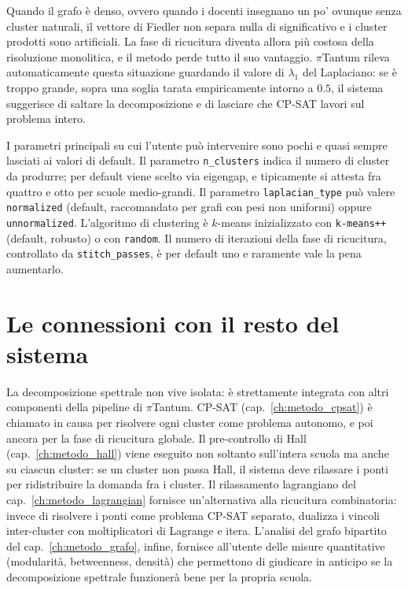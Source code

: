 \begin{avvertenzabox}
Quando il grafo \`e denso, ovvero quando i docenti
insegnano un po' ovunque senza cluster naturali, il vettore
di Fiedler non separa nulla di significativo e i cluster
prodotti sono artificiali. La fase di ricucitura diventa
allora pi\`u costosa della risoluzione monolitica, e il
metodo perde tutto il suo vantaggio. $\pi$Tantum rileva
automaticamente questa situazione guardando il valore di
$\lambda_1$ del Laplaciano: se \`e troppo grande, sopra una
soglia tarata empiricamente intorno a $0.5$, il sistema
suggerisce di saltare la decomposizione e di lasciare che
CP-SAT lavori sul problema intero.
\end{avvertenzabox}

I parametri principali su cui l'utente pu\`o intervenire
sono pochi e quasi sempre lasciati ai valori di default. Il
parametro \texttt{n\_clusters} indica il numero di cluster
da produrre; per default viene scelto via eigengap, e
tipicamente si attesta fra quattro e otto per scuole
medio-grandi. Il parametro \texttt{laplacian\_type} pu\`o
valere \texttt{normalized} (default, raccomandato per grafi
con pesi non uniformi) oppure \texttt{unnormalized}.
L'algoritmo di clustering \`e $k$-means inizializzato con
\texttt{k-means++} (default, robusto) o con
\texttt{random}. Il numero di iterazioni della fase di
ricucitura, controllato da \texttt{stitch\_passes}, \`e per
default uno e raramente vale la pena aumentarlo.

\section{Le connessioni con il resto del sistema}

La decomposizione spettrale non vive isolata: \`e
strettamente integrata con altri componenti della pipeline
di $\pi$Tantum. CP-SAT (cap.~\ref{ch:metodo_cpsat}) \`e
chiamato in causa per risolvere ogni cluster come problema
autonomo, e poi ancora per la fase di ricucitura globale.
Il pre-controllo di Hall (cap.~\ref{ch:metodo_hall}) viene
eseguito non soltanto sull'intera scuola ma anche su
ciascun cluster: se un cluster non passa Hall, il sistema
deve rilassare i ponti per ridistribuire la domanda fra i
cluster. Il rilassamento lagrangiano del
cap.~\ref{ch:metodo_lagrangian} fornisce un'alternativa alla
ricucitura combinatoria: invece di risolvere i ponti come
problema CP-SAT separato, dualizza i vincoli inter-cluster
con moltiplicatori di Lagrange e itera. L'analisi del
grafo bipartito del cap.~\ref{ch:metodo_grafo}, infine,
fornisce all'utente delle misure quantitative
(modularit\`a, betweenness, densit\`a) che permettono di
giudicare in anticipo se la decomposizione spettrale
funzioner\`a bene per la propria scuola.

